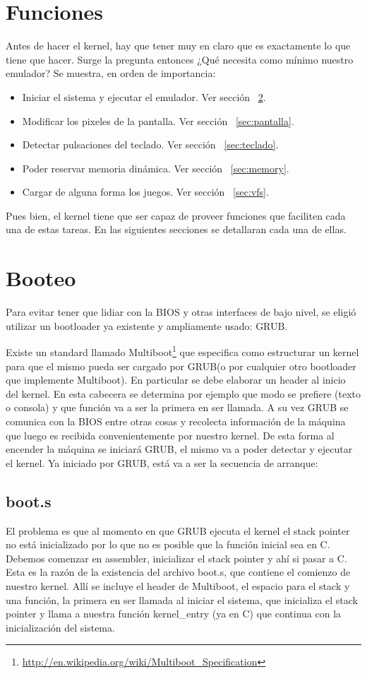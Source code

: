 \section{Funciones}
Antes de hacer el kernel, hay que tener muy en claro que es exactamente lo que tiene que hacer. Surge la pregunta entonces ¿Qué necesita como mínimo nuestro emulador? Se muestra, en orden de importancia:
\begin{itemize}
\item Iniciar el sistema y ejecutar el emulador. Ver sección ~\ref{sec:booteo}.
\item Modificar los pixeles de la pantalla. Ver sección ~\ref{sec:pantalla}.
\item Detectar pulsaciones del teclado. Ver sección ~\ref{sec:teclado}.
\item Poder reservar memoria dinámica. Ver sección ~\ref{sec:memory}.
\item Cargar de alguna forma los juegos. Ver sección ~\ref{sec:vfs}.
\end{itemize}
Pues bien, el kernel tiene que ser capaz de proveer funciones que faciliten cada una de estas tareas. En las siguientes secciones se detallaran cada una de ellas.

\section{Booteo}\label{sec:booteo}
Para evitar tener que lidiar con la BIOS y otras interfaces de bajo nivel, se eligió utilizar un bootloader ya existente y ampliamente usado: GRUB.

Existe un standard llamado Multiboot\footnote{\url{http://en.wikipedia.org/wiki/Multiboot_Specification}} que especifica como estructurar un kernel para que el mismo pueda ser cargado por GRUB(o por cualquier otro bootloader que implemente Multiboot). En particular se debe elaborar un header al inicio del kernel. En esta cabecera se determina por ejemplo que modo se prefiere (texto o consola) y que función va a ser la primera en ser llamada. A su vez GRUB se comunica con la BIOS entre otras cosas y recolecta información de la máquina que luego es recibida convenientemente por nuestro kernel. De esta forma al encender la máquina se iniciará GRUB, el mismo va a poder detectar y ejecutar el kernel. Ya iniciado por GRUB, está va a ser la secuencia de arranque:

\subsection[boot.s]{boot.s\protect\footnotemark{}\protect{}}
El problema es que al momento en que GRUB ejecuta el kernel el stack pointer no está inicializado por lo que no es posible que la función inicial sea en C. Debemos comenzar en assembler, inicializar el stack pointer y ahí si pasar a C. Esta es la razón de la existencia del archivo boot.s, que contiene el comienzo de nuestro kernel. Allí se incluye el header de Multiboot, el espacio para el stack y una función, la primera en ser llamada al iniciar el sistema, que inicializa el stack pointer y llama a nuestra función kernel\_entry (ya en C) que continua con la inicialización del sistema.

